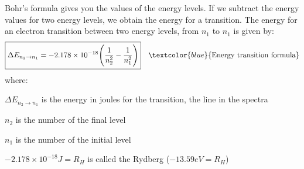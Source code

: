 \documentclass[main.tex]{subfiles}
\newcommand\chapterlabel{electrons}
\begin{document}
\begin{description}
\begin{center}
{}\end{center}


 

 \item[\docfilehook{Bohn's formula for energy transitions}{ }]
Bohr's formula gives you the values of the energy levels. If we subtract the energy values for two energy levels, we obtain the energy for a transition. 
The energy for an electron transition between two energy levels, from $n_1$ to $n_1$ is given by:
\begin{equation*}
\boxed{  \Delta E_{n_2\rightarrow n_1}=-2.178\times 10^{-18} \Bigg( \frac{1}{n_2^2}-\frac{1}{n_1^2}\Bigg)  } \quad \textcolor{blue}{\text{Energy transition formula}}
\end{equation*}
where:
\begin{where}
 \item $\Delta E_{{n_2}\rightarrow n{_1}}$   is the energy in joules for the transition, the line in the spectra
 \item $n_2$  is the number of the final level
  \item $n_1$  is the number of the initial level
    \item $-2.178\times 10^{-18}J=R_H$  is called the Rydberg ($-13.59eV=R_H$)

\end{where}



\end{description}
\end{document}
